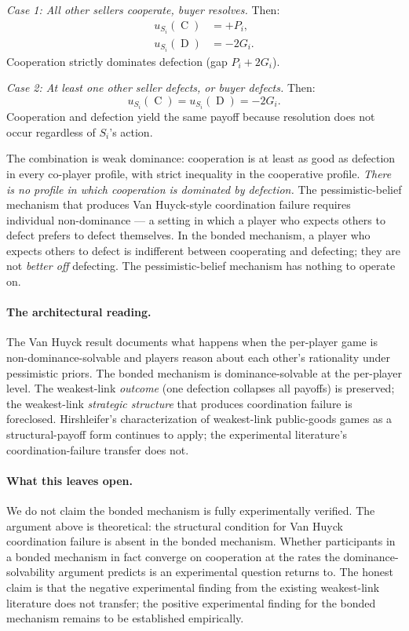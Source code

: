 \documentclass[11pt,a4paper]{article}
\theoremstyle{definition}
\theoremstyle{remark}
\newcommand{\pay}{P}
\newcommand{\cumval}{G}
\DeclareMathOperator{\Coop}{C}
\DeclareMathOperator{\Def}{D}
\begin{document}
\emph{Case 1: All other sellers cooperate, buyer resolves.} Then:
\begin{align*}
  u_{S_i}(\Coop) &= +\pay_i, \\
  u_{S_i}(\Def) &= -2\cumval_i.
\end{align*}
Cooperation strictly dominates defection (gap $\pay_i + 2\cumval_i$).

\emph{Case 2: At least one other seller defects, or buyer defects.}
Then:
\begin{equation*}
  u_{S_i}(\Coop) = u_{S_i}(\Def) = -2\cumval_i.
\end{equation*}
Cooperation and defection yield the same payoff because resolution
does not occur regardless of $S_i$'s action.

The combination is weak dominance: cooperation is at least as good
as defection in every co-player profile, with strict inequality in
the cooperative profile. \emph{There is no profile in which
cooperation is dominated by defection.} The pessimistic-belief
mechanism that produces Van Huyck-style coordination failure
requires individual non-dominance --- a setting in which a player
who expects others to defect prefers to defect themselves. In the
bonded mechanism, a player who expects others to defect is
indifferent between cooperating and defecting; they are not
\emph{better off} defecting. The pessimistic-belief mechanism has
nothing to operate on.

\paragraph{The architectural reading.}
The Van Huyck result documents what happens when the per-player
game is non-dominance-solvable and players reason about each
other's rationality under pessimistic priors. The bonded
mechanism is dominance-solvable at the per-player level. The
weakest-link \emph{outcome} (one defection collapses all payoffs)
is preserved; the weakest-link \emph{strategic structure} that
produces coordination failure is foreclosed. Hirshleifer's
\citep{hirshleifer1983} characterization of weakest-link
public-goods games as a structural-payoff form continues to apply;
the experimental literature's coordination-failure transfer does
not.

\paragraph{What this leaves open.}
We do not claim the bonded mechanism is fully experimentally
verified. The argument above is theoretical: the structural
condition for Van Huyck coordination failure is absent in the
bonded mechanism. Whether participants in a bonded mechanism in
fact converge on cooperation at the rates the
dominance-solvability argument predicts is an experimental
question  returns to. The honest claim is
that the negative experimental finding from the existing
weakest-link literature does not transfer; the positive
experimental finding for the bonded mechanism remains to be
established empirically.
\end{document}
